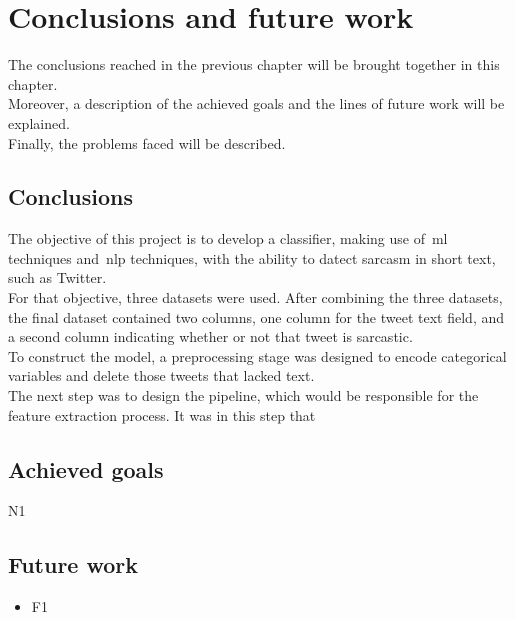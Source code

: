 \chapter{Conclusions and future work}
\label{chap:conclusions}
The conclusions reached in the previous chapter will be brought together in this chapter.\\
Moreover, a description of the achieved goals and the lines of future work will be explained.\\
Finally, the problems faced will be described.

\section{Conclusions}
\label{sec:conclusions}
The objective of this project is to develop a classifier, making use of~\ac{ml} techniques and~\ac{nlp} techniques, with the ability to datect sarcasm in short text, such as Twitter.\\
For that objective, three datasets were used. After combining the three datasets, the final dataset contained two columns, one column for the tweet text field, and a second column indicating whether or not that tweet is sarcastic.\\
To construct the model, a preprocessing stage was designed to encode categorical variables and delete those tweets that lacked text.\\
The next step was to design the pipeline, which would be responsible for the feature extraction process. It was in this step that 

\section{Achieved goals}
\label{sec:achieved-goals}
\begin{description}
\item N1
\end{description}

\section{Future work}
\label{sec:future-work}

\begin{itemize}

\item F1

\end{itemize}

